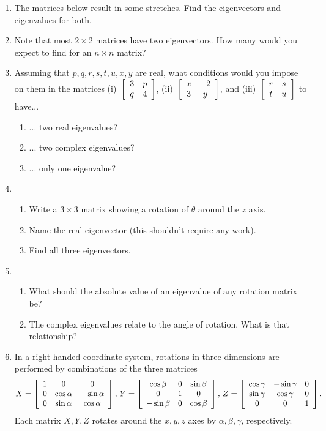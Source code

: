 \documentclass[../gatm.tex]{subfiles}
\begin{document}
\begin{enumerate}
\item The matrices below result in some stretches. Find the eigenvectors and eigenvalues for both.
\begin{enumerate}
\end{enumerate}
\item Note that most $2\times 2$ matrices have two eigenvectors. How many would you expect to find for an $n\times n$ matrix?
\item Assuming that $p,q,r,s,t,u,x,y$ are real, what conditions would you impose on them in the matrices (i)~$\left[\begin{array}{cc} 3 & p \\ q & 4 \end{array}\right]$, (ii)~$\left[\begin{array}{cc} x & -2 \\ 3 & y \end{array}\right]$, and (iii)~$\left[\begin{array}{cc} r & s \\ t & u \end{array}\right]$ to have...
\begin{enumerate}
\item ... two real eigenvalues?
\item ... two complex eigenvalues?
\item ... only one eigenvalue?
\end{enumerate}
\item \begin{enumerate}
\item Write a $3\times 3$ matrix showing a rotation of $\theta$ around the $z$ axis.
\item Name the real eigenvector (this shouldn't require any work).
\item Find all three eigenvectors.
\end{enumerate}
\item \begin{enumerate}
\item What should the absolute value of an eigenvalue of any rotation matrix be?
\item The complex eigenvalues relate to the angle of rotation. What is that relationship?
\end{enumerate}
\item In a right-handed coordinate system, rotations in three dimensions are performed by combinations of the three matrices
$$X=\left[\begin{array}{ccc} 1 & 0 & 0 \\ 0 & \cos\alpha & -\sin\alpha \\ 0 & \sin\alpha & \cos\alpha \end{array}\right],\, Y=\left[\begin{array}{ccc} \cos\beta & 0 & \sin\beta \\ 0 & 1 & 0 \\ -\sin\beta & 0 & \cos\beta \end{array}\right],\, Z=\left[\begin{array}{ccc} \cos\gamma & -\sin\gamma & 0 \\ \sin\gamma & \cos\gamma & 0 \\ 0 & 0 & 1 \end{array}\right].$$
Each matrix $X,Y,Z$ rotates around the $x,y,z$ axes by $\alpha,\beta,\gamma$, respectively.


\end{enumerate}
\end{document}
